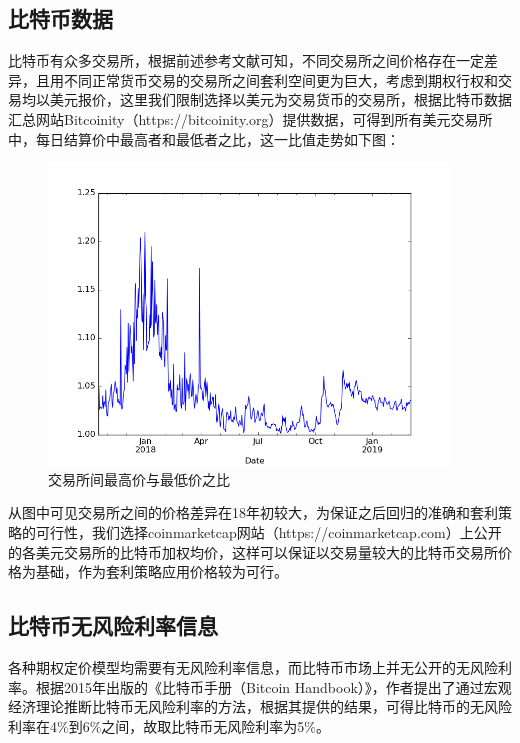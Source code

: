 \subsection{比特币数据}
\par{
    比特币有众多交易所，根据前述参考文献可知，不同交易所之间价格存在一定差异，且用不同正常货币交易的交易所之间套利空间更为巨大\cite{Makarov-2018}，考虑到期权行权和交易均以美元报价，这里我们限制选择以美元为交易货币的交易所，根据比特币数据汇总网站Bitcoinity（https://bitcoinity.org）提供数据，可得到所有美元交易所中，每日结算价中最高者和最低者之比，这一比值走势如下图：
    \begin{figure}[H]
        \begin{small}
            \begin{center}
                \includegraphics[width=0.95\textwidth]{figures/maxmin_ratio_plot.png}
            \end{center}
            \caption{交易所间最高价与最低价之比}
            \label{maxmin_ratio}
        \end{small}
    \end{figure}
    }
    \par{从图中可见交易所之间的价格差异在18年初较大，为保证之后回归的准确和套利策略的可行性，我们选择coinmarketcap网站（https://coinmarketcap.com）上公开的各美元交易所的比特币加权均价，这样可以保证以交易量较大的比特币交易所价格为基础，作为套利策略应用价格较为可行。
    }
\subsection{比特币无风险利率信息}
    \par{各种期权定价模型均需要有无风险利率信息，而比特币市场上并无公开的无风险利率。根据2015年出版的《比特币手册（Bitcoin Handbook）》\cite{WESNER2015223}，作者提出了通过宏观经济理论推断比特币无风险利率的方法，根据其提供的结果，可得比特币的无风险利率在4$\%$到6$\%$之间，故取比特币无风险利率为5$\%$。
    }

